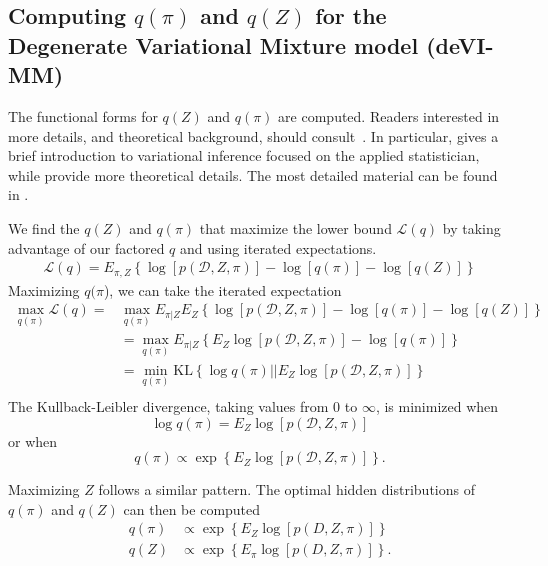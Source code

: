 \documentclass[sagev,times,Review,10pt]{sagej}
\def\l{\left}
\def\r{\right}
\begin{document}
\begin{appendix}

\section{Computing $q(\pi)$ and $q(Z)$ for the Degenerate Variational Mixture model (deVI-MM)} \label{sec:appendixA}

The functional forms for $q(Z)$ and $q(\pi)$ are computed.
Readers interested in more details, and theoretical background, should consult~\citep{rustagi1976variational,blei2017variational,bishop2006pattern,murphy2012machine}.
In particular, \citep{blei2017variational} gives a brief introduction to variational inference focused on the applied statistician, while \citep{bishop2006pattern,murphy2012machine} provide more theoretical details. 
The most detailed material can be found in \citep{rustagi1976variational}.

We find the $q(Z)$ and $q(\pi)$ that maximize the lower bound $\mathcal{L}(q)$ by taking advantage of our factored $q$ and using iterated expectations.
\begin{align}
  \mathcal{L}(q) = E_{\pi,Z} \l\{ \log\l[p(\mathcal{D},Z,\pi)\r] - \log[q(\pi)] - \log[q(Z)]\r\}
\end{align}
Maximizing $q(\pi$), we can take the iterated expectation
\begin{align*}
  \max_{q(\pi)} \mathcal{L}(q) =  &\max_{q(\pi)} E_{\pi|Z} E_{Z} \l\{ \log\l[p(\mathcal{D},Z,\pi)\r] - \log[q(\pi)] - \log[q(Z)]\r\}\\
  &=\max_{q(\pi)} E_{\pi|Z}  \l\{ E_{Z}\log\l[p(\mathcal{D},Z,\pi)\r] - \log[q(\pi)]\r\}\\
  &=\min_{q(\pi)} \text{KL}\l\{ \log q(\pi) ||  E_{Z}\log\l[p(\mathcal{D},Z,\pi)\r] \r\}\\
\end{align*}
The Kullback-Leibler divergence, taking values from 0 to $\infty$, is minimized when
\begin{equation*}
    \log q(\pi) = E_{Z}\log\l[p(\mathcal{D},Z,\pi)\r]
\end{equation*}
or when 
\begin{equation*}
   q(\pi) \propto \exp\l\{E_{Z}\log\l[p(\mathcal{D},Z,\pi)\r]\r\}.   
\end{equation*}

Maximizing $Z$ follows a similar pattern.
The optimal hidden distributions of $q(\pi)$ and $q(Z)$ can then be computed
\begin{align*}
  q(\pi) &\propto \exp\l\{E_{Z}\log\l[p(D,Z,\pi)\r]\r\}\\
  q(Z) &\propto \exp\l\{E_{\pi}\log\l[p(D,Z,\pi)\r]\r\}.
\end{align*}


\end{appendix}
\end{document}
